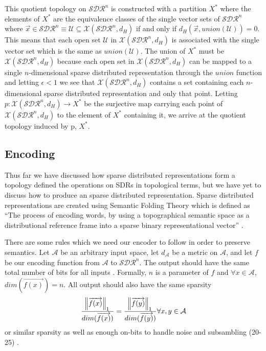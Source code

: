 \documentclass[fleqn,minimal]{article}
\begin{document}
	
	This quotient topology on $\mathcal{SDR}^{n}$ is constructed with a partition $X^{*}$ where the elements of $X^{*}$ are the equivalence classes of the single vector sets of $\mathcal{SDR}^{n}$ where $\overrightarrow{x} \in \mathcal{SDR}^{n} \equiv \mathcal{U} \subseteq \mathcal{X}(\mathcal{SDR}^{n}, d_{H})$ if and only if $d_H(\overrightarrow{x}, union(\mathcal{U})) = 0$. This means that each open set $\mathcal{U}$ in $\mathcal{X}(\mathcal{SDR}^{n}, d_{H})$ is associated with the single vector set which is the same as $union(\mathcal{U})$. The union of $X^{*}$ must be $\mathcal{X}(\mathcal{SDR}^{n}, d_{H})$ because each open set in $\mathcal{X}(\mathcal{SDR}^{n}, d_{H})$ can be mapped to a single $n$-dimensional sparse distributed representation through the $union$ function and letting $\epsilon < 1$ we see that $\mathcal{X}(\mathcal{SDR}^{n}, d_{H})$ contains a set containing each $n$-dimensional sparse distributed representation and only that point. Letting $p : \mathcal{X}(\mathcal{SDR}^{n}, d_{H}) \longrightarrow X^{*}$ be the surjective map carrying each point of $\mathcal{X}(\mathcal{SDR}^{n}, d_{H})$ to the element of $X^{*}$ containing it, we arrive at the quotient topology induced by p, $X^{*}$.
	
	
	\subsection{Encoding}
	
	Thus far we have discussed how sparse distributed representations form a topology defined the operations on SDRs in topological terms, but we have yet to discuss how to produce an sparse distributed representation. Sparse distributed representations are created using Semantic Folding Theory which is defined as ``The process of encoding words, by using a topographical semantic space as a distributional reference frame into a sparse binary representational vector'' \cite{Semantic}.
	
	
	There are some rules which we need our encoder to follow in order to preserve semantics. Let $\mathcal{A}$ be an arbitrary input space, let $d_{\mathcal{A}}$ be a metric on $\mathcal{A}$, and let $f$ be our encoding function from $\mathcal{A}$ to $\mathcal{SDR}^{n}$. The output should have the same total number of bits for all inputs \cite{Purdy}. Formally, $n$ is a parameter of $f$ and $\forall x \in \mathcal{A}$,  $dim(\overrightarrow{f(x)}) = n$. All output should also have the same sparsity $$\frac{\norm{\overrightarrow{f(x)}}_{1}}{dim(\overrightarrow{f(x)})} = \frac{\norm{\overrightarrow{f(y)}}_{1}}{dim(\overrightarrow{f(y)})} \forall x,y \in \mathcal{A}$$ or similar sparsity as well as enough on-bits to handle noise and subsambling (20-25) \cite{Purdy}. 
	
\end{document}
